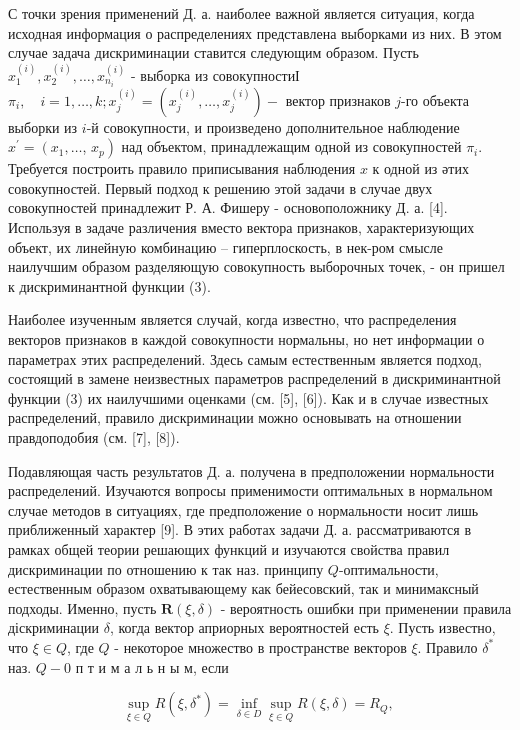 \documentclass[10pt]{article}
\begin{document}
С точки зрения применений Д. а. наиболее важной является ситуация, когда исходная информация о распределениях представлена выборками из них. В этом случае задача дискриминации ставится следующим образом. Пусть $x_{1}^{(i)}, x_{2}^{(i)}, \ldots, x_{n_{i}}^{(i)}$ - выборка из совокупностиІ $\pi_{i}, \quad i=1, \ldots, k ; x_{j}^{(i)}=\left(x_{j}^{(i)}, \ldots, x_{j}^{(i)}\right)-$ вектор признаков $j$-го объекта выборки из $i$-й совокупности, и произведено дополнительное наблюдение $x^{\prime}=\left(x_{1}, \ldots\right.$, $\left.x_{p}\right)$ над объектом, принадлежащим одной из совокупностей $\pi_{i}$. Требуется построить правило приписывания наблюдения $x$ к одной из әтих совокупностей. Первый подход к решению этой задачи в случае двух совокупностей принадлежит Р. А. Фишеру - основоположнику Д. а. [4]. Используя в задаче различения вместо вектора признаков, характеризующих объект, их линейную комбинацию -- гиперплоскость, в нек-ром смысле наилучшим образом разделяющую совокупность выборочных точек, - он пришел к дискриминантной функции (3).



Наиболее изученным является случай, когда известно, что распределения векторов признаков в каждой совокупности нормальны, но нет информации о параметрах этих распределений. Здесь самым естественным является подход, состоящий в замене неизвестных параметров распределений в дискриминантной функции (3) их наилучшими оценками (см. [5], [6]). Как и в случае известных распределений, правило дискриминации можно основывать на отношении правдоподобия (см. [7], [8]).



Подавляющая часть результатов Д. а. получена в предположении нормальности распределений. Изучаются вопросы применимости оптимальных в нормальном случае методов в ситуациях, где предположение о нормальности носит лишь приближенный характер [9]. В этих работах задачи Д. а. рассматриваются в рамках общей теории решающих функций и изучаются свойства правил дискриминации по отношению к так наз. принципу $Q$-оптимальности, естественным образом охватывающему как бейесовский, так и минимаксный подходы. Именно, пусть $\boldsymbol{R}(\xi, \delta)$ - вероятность ошибки при применении правила діскриминации $\delta$, когда вектор априорных вероятностей есть $\xi$. Пусть известно, что $\xi \in Q$, где $Q$ - некоторое множество в пространстве векторов $\xi$. Правило $\delta^{*}$ наз. $Q-0$ п т и м а л ь н ы м, если



\[

\sup _{\xi \in Q} R\left(\xi, \delta^{*}\right)=\inf _{\delta \in D} \sup _{\xi \in Q} R(\xi, \delta)=R_{Q} \text {, }

\]
\end{document}
